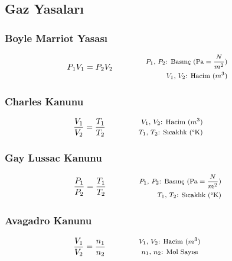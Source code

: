 \subsection{Gaz Yasaları}

\subsubsection*{Boyle Marriot Yasası}
\begin{equation}
    P_1 V_1 = P_2 V_2 \qquad \qquad \parbox{4cm}{\footnotesize$\begin{aligned}
        P_1\text{, }P_2\text{: Basınç (Pa} = \frac{N}{m^2}\text{)} \\
        V_1\text{, }V_2\text{: Hacim } (m^3)
\end{aligned}$}
\end{equation}

\subsubsection*{Charles Kanunu}
\begin{equation}
    \frac{V_1}{V_2} = \frac{T_1}{T_2} \qquad \qquad \parbox{4cm}{\footnotesize$\begin{aligned}
        V_1\text{, }V_2\text{: Hacim } (m^3) \\
        T_1\text{, }T_2\text{: Sıcaklık } (\text{\textdegree K})
\end{aligned}$}
\end{equation}

\subsubsection*{Gay Lussac Kanunu}
\begin{equation}
    \frac{P_1}{P_2} = \frac{T_1}{T_2} \qquad \qquad \parbox{4cm}{\footnotesize$\begin{aligned}
        P_1\text{, }P_2\text{: Basınç (Pa} = \frac{N}{m^2}\text{)} \\
        T_1\text{, }T_2\text{: Sıcaklık } (\text{\textdegree K})
\end{aligned}$}
\end{equation}

\subsubsection*{Avagadro Kanunu}
\begin{equation}
    \frac{V_1}{V_2} = \frac{n_1}{n_2} \qquad \qquad \parbox{4cm}{\footnotesize$\begin{aligned}
        V_1\text{, }V_2\text{: Hacim } (m^3) \\
        n_1\text{, }n_2\text{: Mol Sayısı }
\end{aligned}$}
\end{equation}

